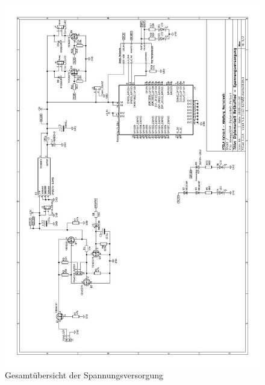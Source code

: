 \begin{figure}
    \includegraphics[scale=0.85,page=1]{fig/elektro/Schaltplan.pdf}
    \caption{Gesamtübersicht der Spannungsversorgung}
\end{figure}

